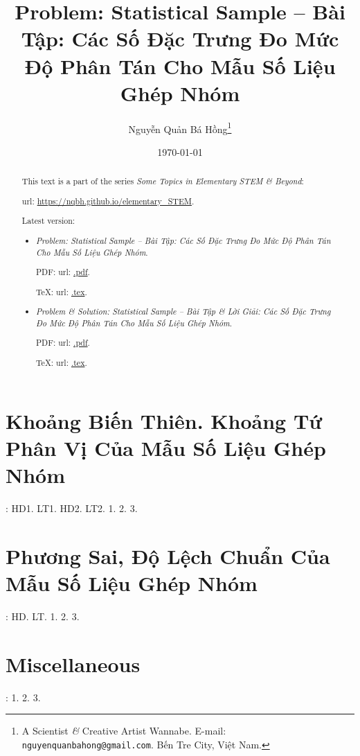 \documentclass{article}
\title{Problem: Statistical Sample -- Bài Tập: Các Số Đặc Trưng Đo Mức Độ Phân Tán Cho Mẫu Số Liệu Ghép Nhóm}
\author{Nguyễn Quản Bá Hồng\footnote{A Scientist {\it\&} Creative Artist Wannabe. E-mail: {\tt nguyenquanbahong@gmail.com}. Bến Tre City, Việt Nam.}}
\date{\today}
\begin{document}
\maketitle
\begin{abstract}
	This text is a part of the series {\it Some Topics in Elementary STEM \& Beyond}:
	
	{\sc url}: \url{https://nqbh.github.io/elementary_STEM}.
	
	Latest version:
	\begin{itemize}
		\item {\it Problem: Statistical Sample -- Bài Tập: Các Số Đặc Trưng Đo Mức Độ Phân Tán Cho Mẫu Số Liệu Ghép Nhóm}.
		
		PDF: {\sc url}: \url{.pdf}.
		
		\TeX: {\sc url}: \url{.tex}.
		\item {\it Problem \& Solution: Statistical Sample -- Bài Tập \& Lời Giải: Các Số Đặc Trưng Đo Mức Độ Phân Tán Cho Mẫu Số Liệu Ghép Nhóm}.
		
		PDF: {\sc url}: \url{.pdf}.
		
		\TeX: {\sc url}: \url{.tex}.
	\end{itemize}
\end{abstract}
\tableofcontents


\section{Khoảng Biến Thiên. Khoảng Tứ Phân Vị Của Mẫu Số Liệu Ghép Nhóm}
\cite[Chap. III, \S1, pp. 84--88]{SGK_Toan_12_Canh_Dieu_tap_1}: HD1. LT1. HD2. LT2. 1. 2. 3.


\section{Phương Sai, Độ Lệch Chuẩn Của Mẫu Số Liệu Ghép Nhóm}
\cite[Chap. III, \S2, pp. 84--88]{SGK_Toan_12_Canh_Dieu_tap_1}: HD. LT. 1. 2. 3.


\section{Miscellaneous}
\cite[BTCCIII, p. 93]{SGK_Toan_12_Canh_Dieu_tap_1}: 1. 2. 3.
\end{document}
